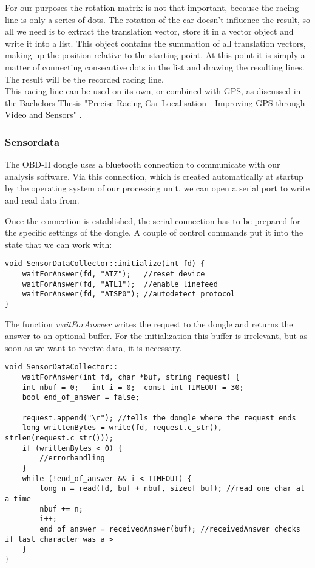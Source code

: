 For our purposes the rotation matrix is not that important, because the racing line is only a series of dots. The rotation of the car doesn't influence the result, so all we need is to extract the translation vector, store it in a vector object and write it into a list. This object contains the summation of all translation vectors, making up the position relative to the starting point.
At this point it is simply a matter of connecting consecutive dots in the list and drawing the resulting lines. The result will be the recorded racing line.\\
This racing line can be used on its own, or combined with GPS, as discussed in the Bachelors Thesis "Precise Racing Car Localisation - Improving GPS through Video and Sensors" \cite{hoffmann16}.

\subsubsection{Sensordata}
The OBD-II dongle uses a bluetooth connection to communicate with our analysis software. Via this connection, which is created automatically at startup by the operating system of our processing unit, we can open a serial port to write and read data from.

Once the connection is established, the serial connection has to be prepared for the specific settings of the dongle.
A couple of control commands put it into the state that we can work with: 

\begin{lstlisting}
void SensorDataCollector::initialize(int fd) {
	waitForAnswer(fd, "ATZ");	//reset device
	waitForAnswer(fd, "ATL1");	//enable linefeed
	waitForAnswer(fd, "ATSP0");	//autodetect protocol
}
\end{lstlisting}
The function \textit{waitForAnswer} writes the request to the dongle and returns the answer to an optional buffer. For the initialization this buffer is irrelevant, but as soon as we want to receive data, it is necessary.
\begin{lstlisting}
void SensorDataCollector::
	waitForAnswer(int fd, char *buf, string request) {
	int nbuf = 0; 	int i = 0;	const int TIMEOUT = 30;
	bool end_of_answer = false;

	request.append("\r"); //tells the dongle where the request ends
	long writtenBytes = write(fd, request.c_str(), strlen(request.c_str()));
	if (writtenBytes < 0) {
		//errorhandling
	}
	while (!end_of_answer && i < TIMEOUT) {
		long n = read(fd, buf + nbuf, sizeof buf); //read one char at a time
		nbuf += n;
		i++;
		end_of_answer = receivedAnswer(buf); //receivedAnswer checks if last character was a >
	}
}
\end{lstlisting}

